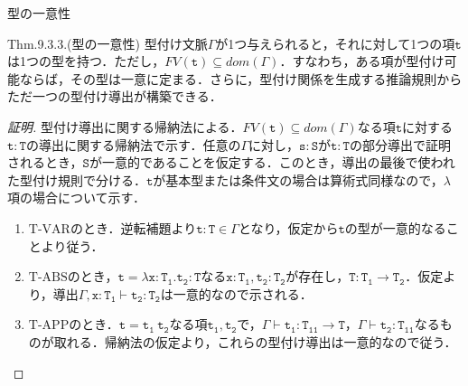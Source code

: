 \documentclass[9pt]{beamer}
\begin{document}
\begin{frame}{型の一意性}
\begin{alertblock}{Thm.9.3.3.(型の一意性)}
型付け文脈$\Gamma$が1つ与えられると，それに対して1つの項$\mathtt{t}$は1つの型を持つ．ただし，$\mathrel{FV}(\mathtt{t})\subseteq\mathrel{dom}(\Gamma)$．すなわち，ある項が型付け可能ならば，その型は一意に定まる．さらに，型付け関係を生成する推論規則からただ一つの型付け導出が構築できる．
\end{alertblock}
\begin{proof}[証明]
型付け導出に関する帰納法による．$\mathrel{FV}(\mathtt{t})\subseteq\mathrel{dom}(\Gamma)$なる項$\mathtt{t}$に対する$\mathtt{t:T}$の導出に関する帰納法で示す．任意の$\Gamma$に対し，$\mathtt{s:S}$が$\mathtt{t:T}$の部分導出で証明されるとき，$\mathtt{S}$が一意的であることを仮定する．このとき，導出の最後で使われた型付け規則で分ける．$\mathtt{t}$が基本型または条件文の場合は算術式同様なので，$\lambda$項の場合について示す．
\begin{enumerate}
\item $\mathrm{T}$-$\mathrm{VAR}$のとき．逆転補題より$\mathtt{t:T}\in\Gamma$となり，仮定から$\mathtt{t}$の型が一意的なることより従う．
\item $\mathrm{T}$-$\mathrm{ABS}$のとき，$\mathtt{t = \lambda x: T_{1}.t_{2}:T}$なる$\mathtt{x:T_{1}, t_{2}:T_{2}}$が存在し，$\mathtt{T:T_{1}\rightarrow T_{2}}$．仮定より，導出$\Gamma, \mathtt{x:T_{1}}\vdash \mathtt{t_{2}:T_{2}}$は一意的なので示される．
\item $\mathrm{T}$-$\mathrm{APP}$のとき．$\mathtt{t =t_{1}\ t_{2}}$なる項$\mathtt{t_{1}, t_{2}}$で，$\Gamma\vdash\mathtt{t_{1}:T_{11}\rightarrow T}$，$\Gamma\vdash\mathtt{t_{2}:T_{11}}$なるものが取れる．帰納法の仮定より，これらの型付け導出は一意的なので従う．
\end{enumerate}
\end{proof}
\end{frame}
\end{document}
